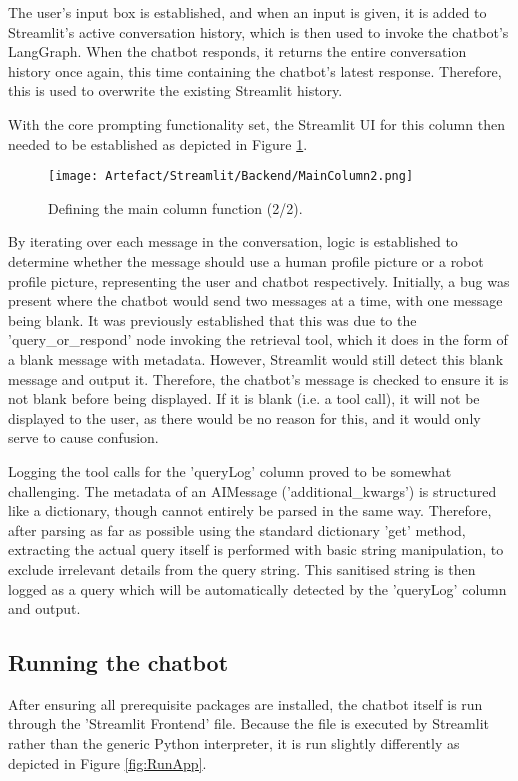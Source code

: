\noindent The user's input box is established, and when an input is given, it is added to Streamlit's active 
conversation history, which is then used to invoke the chatbot's LangGraph. When the chatbot responds, it returns 
the entire conversation history once again, this time containing the chatbot's latest response. Therefore, this is used 
to overwrite the existing Streamlit history.

\para With the core prompting functionality set, the Streamlit UI for this column then needed to be established as depicted 
in Figure \ref{fig:StreamlitMainColumn2}.

\begin{figure}[H]
    \centering
    \texttt{[image: Artefact/Streamlit/Backend/MainColumn2.png]}
    \caption{Defining the main column function (2/2). \label{fig:StreamlitMainColumn2}}
\end{figure}

\noindent By iterating over each message in the conversation, logic is established to determine whether the message should 
use a human profile picture or a robot profile picture, representing the user and chatbot respectively. Initially, a bug was 
present where the chatbot would send two messages at a time, with one message being blank. It was previously established that 
this was due to the 'query\_or\_respond' node invoking the retrieval tool, which it does in the form of a blank message with 
metadata. However, Streamlit would still detect this blank message and output it. Therefore, the chatbot's message is checked 
to ensure it is not blank before being displayed. If it is blank (i.e. a tool call), it will not be displayed to the user, as 
there would be no reason for this, and it would only serve to cause confusion.

\para Logging the tool calls for the 'queryLog' column proved to be somewhat challenging. The metadata of an AIMessage ('additional\_kwargs')
is structured like a dictionary, though cannot entirely be parsed in the same way. Therefore, after parsing as far as possible using the 
standard dictionary 'get' method, extracting the actual query itself is performed with basic string manipulation, to exclude irrelevant 
details from the query string. This sanitised string is then logged as a query which will be automatically detected by the 'queryLog' column
and output.

\newpage 

\subsection{Running the chatbot}\label{sec:ChatbotRun}
After ensuring all prerequisite packages are installed, the chatbot itself is run through the 'Streamlit Frontend' file. Because the file 
is executed by Streamlit rather than the generic Python interpreter, it is run slightly differently as depicted in Figure \ref{fig:RunApp}.

